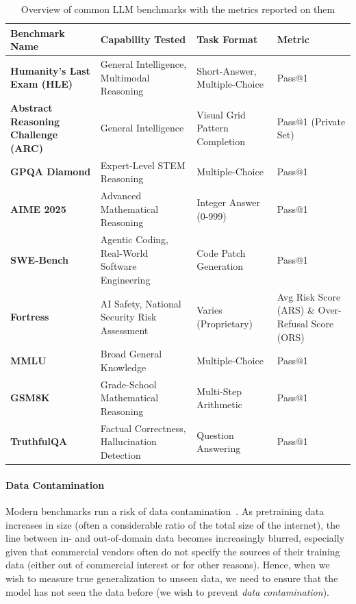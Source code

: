 \begin{table}[tb]
    \centering
    \begin{tabular}{@{}p{}p{}p{}p{}@{}}
        \toprule
        \textbf{Benchmark Name} & \textbf{Capability Tested} & \textbf{Task Format} & \textbf{Metric} \\
        \midrule
        \textbf{Humanity's Last Exam (HLE)} & General Intelligence, Multimodal Reasoning & Short-Answer, Multiple-Choice & Pass@1 \\
        \textbf{Abstract Reasoning Challenge (ARC)} & General Intelligence & Visual Grid Pattern Completion & Pass@1 (Private Set) \\
        \textbf{GPQA Diamond} & Expert-Level STEM Reasoning & Multiple-Choice & Pass@1 \\
        \textbf{AIME 2025} & Advanced Mathematical Reasoning & Integer Answer (0-999) & Pass@1 \\
        \textbf{SWE-Bench} & Agentic Coding, Real-World Software Engineering & Code Patch Generation & Pass@1 \\
        \textbf{Fortress} & AI Safety, National Security Risk Assessment & Varies (Proprietary) & Avg Risk Score (ARS) \& Over-Refusal Score (ORS) \\
        \textbf{MMLU} & Broad General Knowledge & Multiple-Choice & Pass@1 \\
        \textbf{GSM8K} & Grade-School Mathematical Reasoning & Multi-Step Arithmetic & Pass@1 \\
        \textbf{TruthfulQA} & Factual Correctness, Hallucination Detection & Question Answering & Pass@1 \\
        \bottomrule
    \end{tabular}
    \caption{Overview of common LLM benchmarks with the metrics reported on them}
    \label{tab:llm-benchmarks}
\end{table}

\paragraph{Data Contamination}
Modern benchmarks run a risk of data contamination~\citep{balloccu-etal-2024-leak}.
As pretraining data increases in size (often a considerable ratio of the total size of the internet), the line between in- and out-of-domain data becomes increasingly blurred, especially given that commercial vendors often do not specify the sources of their training data (either out of commercial interest or for other  reasons). Hence, when we wish to measure true generalization to unseen data,  we need to ensure that the model has not seen the data before (we wish to prevent {\em data contamination}).


